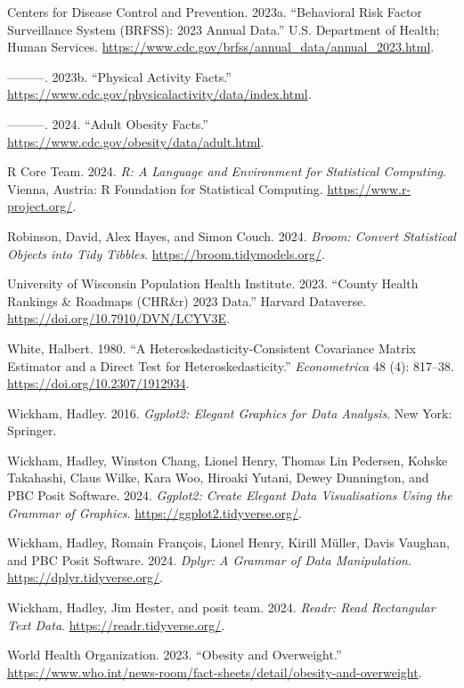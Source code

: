 \documentclass[
  letterpaper,
  DIV=11,
  numbers=noendperiod]{scrartcl}
\newlength{\cslhangindent}
\newenvironment{CSLReferences}[2] %
 {\begin{list}{}{%
  \setlength{\itemindent}{0pt}
  \setlength{\leftmargin}{0pt}
  \setlength{\parsep}{0pt}
  \ifodd #1
   \setlength{\leftmargin}{\cslhangindent}
   \setlength{\itemindent}{-1\cslhangindent}
  \fi
  \setlength{\itemsep}{#2\baselineskip}}}
 {\end{list}}
\begin{document}
\label{refs}
\begin{CSLReferences}{1}{0}
Centers for Disease Control and Prevention. 2023a. {``Behavioral Risk
Factor Surveillance System (BRFSS): 2023 Annual Data.''} U.S. Department
of Health; Human Services.
\url{https://www.cdc.gov/brfss/annual_data/annual_2023.html}.

---------. 2023b. {``Physical Activity Facts.''}
\url{https://www.cdc.gov/physicalactivity/data/index.html}.

---------. 2024. {``Adult Obesity Facts.''}
\url{https://www.cdc.gov/obesity/data/adult.html}.

R Core Team. 2024. \emph{R: A Language and Environment for Statistical
Computing}. Vienna, Austria: R Foundation for Statistical Computing.
\url{https://www.r-project.org/}.

Robinson, David, Alex Hayes, and Simon Couch. 2024. \emph{Broom: Convert
Statistical Objects into Tidy Tibbles}.
\url{https://broom.tidymodels.org/}.

University of Wisconsin Population Health Institute. 2023. {``County
Health Rankings \& Roadmaps (CHR\&r) 2023 Data.''} Harvard Dataverse.
\url{https://doi.org/10.7910/DVN/LCYV3E}.

White, Halbert. 1980. {``A Heteroskedasticity-Consistent Covariance
Matrix Estimator and a Direct Test for Heteroskedasticity.''}
\emph{Econometrica} 48 (4): 817--38.
\url{https://doi.org/10.2307/1912934}.

Wickham, Hadley. 2016. \emph{Ggplot2: Elegant Graphics for Data
Analysis}. New York: Springer.

Wickham, Hadley, Winston Chang, Lionel Henry, Thomas Lin Pedersen,
Kohske Takahashi, Claus Wilke, Kara Woo, Hiroaki Yutani, Dewey
Dunnington, and PBC Posit Software. 2024. \emph{Ggplot2: Create Elegant
Data Visualisations Using the Grammar of Graphics}.
\url{https://ggplot2.tidyverse.org/}.

Wickham, Hadley, Romain François, Lionel Henry, Kirill Müller, Davis
Vaughan, and PBC Posit Software. 2024. \emph{Dplyr: A Grammar of Data
Manipulation}. \url{https://dplyr.tidyverse.org/}.

Wickham, Hadley, Jim Hester, and posit team. 2024. \emph{Readr: Read
Rectangular Text Data}. \url{https://readr.tidyverse.org/}.

World Health Organization. 2023. {``Obesity and Overweight.''}
\url{https://www.who.int/news-room/fact-sheets/detail/obesity-and-overweight}.

\end{CSLReferences}
\end{document}
